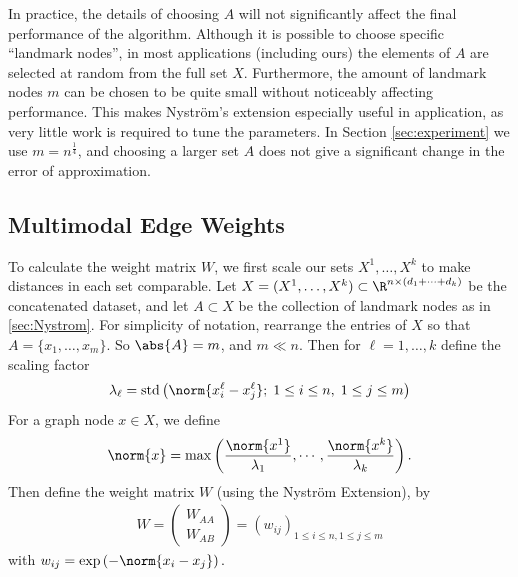 \documentclass{article}
\begin{document}
In practice, the details of choosing $A$ will not significantly affect the final
performance of the algorithm. Although it is possible to choose specific
``landmark nodes'', in most applications (including ours) the elements of $A$
are selected at random from the full set $X$. Furthermore, the amount of
landmark nodes $m$ can be chosen to be quite small without noticeably affecting
performance. This makes Nystr\"{o}m's extension especially useful in application,
as very little work is required to tune the parameters.  In Section
\ref{sec:experiment} we use $m = n^{\frac{1}{4}}$, and choosing a larger set $A$
does not give a significant change in the error of approximation.


\subsection{Multimodal Edge Weights}\label{sec:Weights}

To calculate the weight matrix $W$, we first scale our sets $X^1, \ldots, X^k$
to make distances in each set comparable. Let
$X = (X^1, \ldots, X^k) \subset \R^{n\times (d_1+\cdots+d_k)}$ be the
concatenated dataset, and let $A\subset X$ be the collection of landmark nodes
as in \ref{sec:Nystrom}. For simplicity of notation, rearrange the entries of
$X$ so that $A = \{x_1,\ldots,x_m\}$.  So $\abs{A} = m$, and $m\ll n$. Then for
$\ell = 1,\ldots,k$ define the scaling factor
\begin{align}
  \lambda_\ell = \text{std}\left(\norm{x_i^\ell-x_j^\ell} ;\; 1\leq i\leq
  n,\; 1\leq j\leq m\right)
\end{align}
For a graph node $x\in X$, we define
\begin{align}
  \norm{x} = \max\left( \frac{\norm{x^1}}{\lambda_1},\cdots,
  \frac{\norm{x^k}}{\lambda_k}\right).
\end{align}
Then define the weight matrix $W$ (using the Nystr\"{o}m Extension), by
\begin{align}
  W = \begin{pmatrix} W_{AA} \\ W_{AB}
  \end{pmatrix} = (w_{ij})_{1\leq i \leq n, 1\leq j \leq m}
\end{align}
with $w_{ij} = \text{exp}\left(-\norm{x_i - x_j}\right).$
\end{document}
